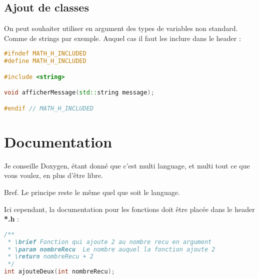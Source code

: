 \documentclass[a4paper,twoside]{article}
\begin{document}
\subsection{Ajout de classes}
On peut souhaiter utiliser en argument des types de variables non standard. Comme de strings par exemple. Auquel cas il faut 
les inclure dans le header : 
\begin{lstlisting}[language=C++]
#ifndef MATH_H_INCLUDED
#define MATH_H_INCLUDED

#include <string>

void afficherMessage(std::string message);

#endif // MATH_H_INCLUDED
\end{lstlisting}

\section{Documentation}
Je conseille Doxygen, étant donné que c'est multi language, et multi tout ce que vous voulez, en plus d'être libre. 

Bref. Le principe reste le même quel que soit le language. 

Ici cependant, la documentation pour les fonctions doit être placée dans le header \textbf{*.h} : 
\begin{lstlisting}[language=C++]
/**
 * \brief Fonction qui ajoute 2 au nombre recu en argument
 * \param nombreRecu  Le nombre auquel la fonction ajoute 2
 * \return nombreRecu + 2
 */
int ajouteDeux(int nombreRecu);
\end{lstlisting}
\end{document}
